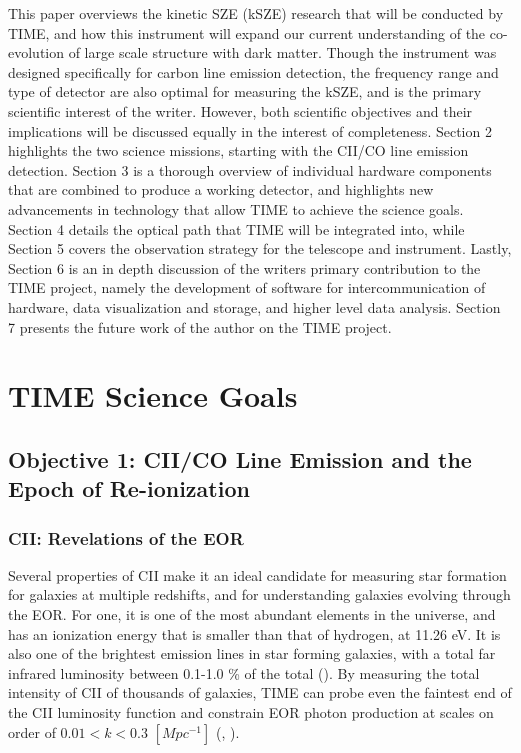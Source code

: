 \documentclass[manuscript]{aastex}
\begin{document}
This paper overviews the kinetic SZE (kSZE) research that will be conducted by TIME, and how this instrument will expand our current understanding of the co-evolution of large scale structure with dark matter. Though the instrument was designed specifically for carbon line emission detection, the frequency range and type of detector are also optimal for measuring the kSZE, and is the primary scientific interest of the writer. However, both scientific objectives and their implications will be discussed equally in the interest of completeness. Section 2 highlights the two science missions, starting with the CII/CO line emission detection. Section 3 is a thorough overview of individual hardware components that are combined to produce a working detector, and highlights new advancements in technology that allow TIME to achieve the science goals. Section 4 details the optical path that TIME will be integrated into, while Section 5 covers the observation strategy for the telescope and instrument. Lastly, Section 6 is an in depth discussion of the writers primary contribution to the TIME project, namely the development of software for intercommunication of hardware, data visualization and storage, and higher level data analysis. Section 7 presents the future work of the author on the TIME project. 
\newpage
\section{\textbf{TIME Science Goals}}
\subsection{\textbf{Objective 1: CII/CO Line Emission and the Epoch of Re-ionization}}

\subsubsection{\textbf{CII: Revelations of the EOR}}
Several properties of CII make it an ideal candidate for measuring star formation for galaxies at multiple redshifts, and for understanding galaxies evolving through the EOR. For one, it is one of the most abundant elements in the universe, and has an ionization energy that is smaller than that of hydrogen, at 11.26 eV. It is also one of the brightest emission lines in star forming galaxies, with a total far infrared luminosity between 0.1-1.0 \% of the total (\cite{Stacey1991}). By measuring the total intensity of CII of thousands of galaxies, TIME can probe even the faintest end of the CII luminosity function and constrain EOR photon production at scales on order of  $0.01 < k < 0.3$  $[Mpc^{-1}]$  (\cite{Gong2012}, \cite{Crites2014}). 
\end{document}
